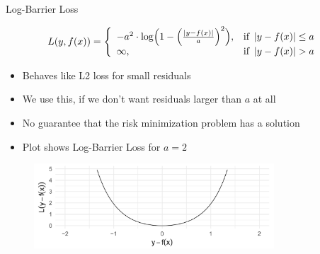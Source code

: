 \begin{vbframe}{Log-Barrier Loss}

\begin{footnotesize}
\[
  L(y, f(x)) = \left\{\begin{array}{lr}
        -a^{2} \cdot \log \Bigl( 1 - \Bigl(\frac{\left|y - f(x)\right|}{a}\Bigr)^2 \Bigr), & \text{if } \left|y-f(x)\right| \leq a \\
        \infty, & \text{if } \left|y-f(x)\right|  > a
        \end{array}\right.
  \]
\end{footnotesize}
\begin{itemize}
\item Behaves like L2 loss for small residuals
\item We use this, if we don't want residuals larger than $a$ at all
\item No guarantee that the risk minimization problem has a solution
\item Plot shows Log-Barrier Loss for $a=2$
\end{itemize}

\begin{figure}
\includegraphics[width = 0.8\textwidth]{figure_man/log-barrier01.png}
\end{figure}


\end{vbframe}



